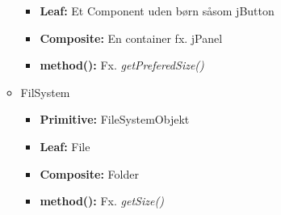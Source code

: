 \documentclass{article}
\begin{document}
\begin{itemize}
\begin{itemize}
\begin{itemize}
			\item \textbf{Leaf:} Et Component uden børn såsom jButton
			\item \textbf{Composite: } En container fx. jPanel
			\item \textbf{method():} Fx. \textit{getPreferedSize()} 
		\end{itemize}
		\item FilSystem
		\begin{itemize}
			\item \textbf{Primitive:} FileSystemObjekt 
			\item \textbf{Leaf:} File
			\item \textbf{Composite:} Folder 
			\item \textbf{method():} Fx. \textit{getSize()}
		\end{itemize}
	\end{itemize}
\end{itemize}
\end{document}
